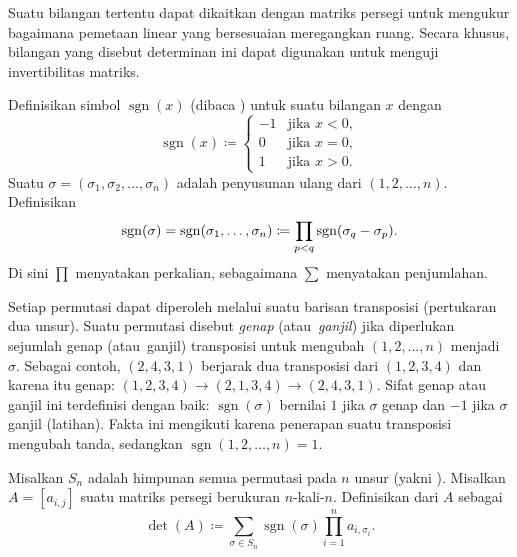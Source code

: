 Suatu bilangan tertentu dapat dikaitkan dengan matriks persegi untuk mengukur
bagaimana pemetaan linear yang bersesuaian meregangkan ruang.  Secara khusus,
bilangan yang disebut determinan ini dapat digunakan untuk menguji invertibilitas matriks.

Definisikan simbol
$\operatorname{sgn}(x)$ (dibaca ) untuk suatu bilangan $x$ dengan
\begin{equation*}
\operatorname{sgn}(x)
\coloneqq
\begin{cases}
-1 & \text{jika } x < 0 , \\
0  & \text{jika } x = 0 , \\
1  & \text{jika } x > 0 .
\end{cases}
\end{equation*}
Suatu \emph{}
$\sigma = (\sigma_1,\sigma_2,\ldots,\sigma_n)$ adalah
penyusunan ulang dari $(1,2,\ldots,n)$.
Definisikan
\begin{equation} \label{eq:sgndef}
\operatorname{sgn}(\sigma) = \operatorname{sgn}(\sigma_1,\ldots,\sigma_n)
\coloneqq
\prod_{p < q} \operatorname{sgn}(\sigma_q-\sigma_p) .
\avoidbreak
\end{equation}
Di sini $\prod$ menyatakan perkalian, sebagaimana $\sum$ menyatakan
penjumlahan.

Setiap permutasi dapat diperoleh melalui
suatu barisan transposisi (pertukaran dua unsur).
Suatu permutasi disebut
\emph{genap}
(atau\ \emph{ganjil})
jika diperlukan sejumlah genap (atau\ ganjil)
transposisi untuk mengubah $(1,2,\ldots,n)$ menjadi $\sigma$.
Sebagai contoh, $(2,4,3,1)$ berjarak dua transposisi dari
$(1,2,3,4)$ dan karena itu genap: $(1,2,3,4) \to (2,1,3,4) \to (2,4,3,1)$.
Sifat genap atau ganjil ini terdefinisi dengan baik:
$\operatorname{sgn}(\sigma)$
bernilai $1$ jika $\sigma$ genap dan $-1$ jika $\sigma$ ganjil (latihan).
Fakta ini mengikuti karena penerapan
suatu transposisi mengubah tanda, sedangkan
$\operatorname{sgn}(1,2,\ldots,n) = 1$.

Misalkan $S_n$ adalah himpunan semua permutasi pada $n$ unsur (yakni
\emph{}).
Misalkan $A= [a_{i,j}]$ suatu matriks persegi berukuran $n$-kali-$n$.
Definisikan \emph{} dari $A$ sebagai
\begin{equation*}
\det(A) \coloneqq
\sum_{\sigma \in S_n}
\operatorname{sgn} (\sigma) \prod_{i=1}^n a_{i,\sigma_i} .
\end{equation*}

